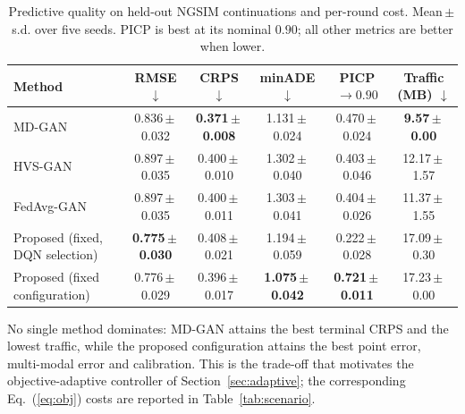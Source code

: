 \begin{table}[!t]
\centering
\caption{Predictive quality on held-out NGSIM continuations and per-round cost.
Mean\,$\pm$\,s.d. over five seeds. PICP is best at its nominal $0.90$; all other
metrics are better when lower.}
\label{tab:metrics}
\begin{tabular}{lccccc}
\toprule
Method & RMSE $\downarrow$ & CRPS $\downarrow$ & minADE $\downarrow$
       & PICP $\rightarrow 0.90$ & Traffic (MB) $\downarrow$ \\
\midrule
MD-GAN~\cite{hardy2019mdgan}
  & 0.836\,$\pm$\,0.032 & \textbf{0.371\,$\pm$\,0.008} & 1.131\,$\pm$\,0.024
  & 0.470\,$\pm$\,0.024 & \textbf{9.57\,$\pm$\,0.00} \\
HVS-GAN~\cite{wu2024hvsgan}
  & 0.897\,$\pm$\,0.035 & 0.400\,$\pm$\,0.010 & 1.302\,$\pm$\,0.040
  & 0.403\,$\pm$\,0.046 & 12.17\,$\pm$\,1.57 \\
FedAvg-GAN
  & 0.897\,$\pm$\,0.035 & 0.400\,$\pm$\,0.011 & 1.303\,$\pm$\,0.041
  & 0.404\,$\pm$\,0.026 & 11.37\,$\pm$\,1.55 \\
Proposed (fixed, DQN selection)
  & \textbf{0.775\,$\pm$\,0.030} & 0.408\,$\pm$\,0.021 & 1.194\,$\pm$\,0.059
  & 0.222\,$\pm$\,0.028 & 17.09\,$\pm$\,0.30 \\
Proposed (fixed configuration)
  & 0.776\,$\pm$\,0.029 & 0.396\,$\pm$\,0.017 & \textbf{1.075\,$\pm$\,0.042}
  & \textbf{0.721\,$\pm$\,0.011} & 17.23\,$\pm$\,0.00 \\
\bottomrule
\end{tabular}
\begin{flushleft}\footnotesize
No single method dominates: MD-GAN attains the best terminal CRPS and the lowest
traffic, while the proposed configuration attains the best point error,
multi-modal error and calibration. This is the trade-off that motivates the
objective-adaptive controller of Section~\ref{sec:adaptive}; the corresponding
Eq.~(\ref{eq:obj}) costs are reported in Table~\ref{tab:scenario}.
\end{flushleft}
\end{table}
